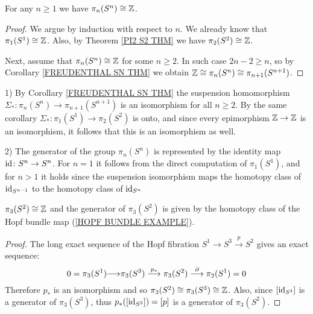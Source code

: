 \begin{corollary}
\label{PIN SN COROLLARY}
For any $n\geq 1$ we have $\pi_{n}(S^{n})\cong {\mathbb Z}$. 
\end{corollary}

\begin{proof}

We argue by induction with respect to $n$. We already know that $\pi_{1}(S^{1})\cong {\mathbb Z}$. 
Also, by Theorem \ref{PI2 S2 THM} we have $\pi_{2}(S^{2}) \cong {\mathbb Z}$. 

Next, assume that $\pi_{n}(S^{n})\cong {\mathbb Z}$ for some $n\geq 2$. 
In such case $2n - 2 \geq n$, so by Corollary \ref{FREUDENTHAL SN THM} we obtain 
${\mathbb Z} \cong \pi_{n}(S^{n})\cong \pi_{n+1}(S^{n+1})$. 
\end{proof}

\begin{note}
\label{PIN SN NOTE}
1) By Corollary \ref{FREUDENTHAL SN THM} the suspension homomorphism 
$\Sigma_{\ast}\colon \pi_{n}(S^{n}) \to \pi_{n+1}(S^{n+1})$
is an isomorphism for all $n\geq 2$. By the same corollary 
$\Sigma_{\ast}\colon \pi_{1}(S^{1}) \to \pi_{2}(S^{2})$ is onto,  
and since every epimorphism ${\mathbb Z} \to {\mathbb Z}$ is an isomorphism, it follows 
that this is an isomorphism as well. 

2) The generator of the group $\pi_{n}(S^{n})$ is represented by 
the identity map $\mathrm{id}\colon S^{n}\to S^{n}$. For $n=1$ it follows 
from the direct computation of $\pi_{1}(S^{1})$, and for $n> 1$
it holds since the suspension isomorphism maps the homotopy class 
of $\mathrm{id}_{S^{n-1}}$ to the homotopy class of $\mathrm{id}_{S^{n}}$
\end{note}


\begin{corollary}
$\pi_{3}(S^{2}) \cong {\mathbb Z}$ and the generator of $\pi_{3}(S^{2})$ is given by the 
homotopy class of the Hopf bundle map (\ref{HOPF BUNDLE EXAMPLE}). 
\end{corollary}

\begin{proof}
The long exact sequence of the Hopf fibration $S^{1}\to S^{3} \overset{p}{\to} S^{2}$ gives
an exact sequence:
\[
0 = \pi_{3}(S^{1}) {\longrightarrow}
\pi_{3}(S^{3}) \overset{p_{\ast}}{\longrightarrow}
\pi_{3}(S^{2}) \overset{\partial}{\longrightarrow} 
\pi_{2}(S^{1}) = 0
\]
Therefore $p_{\ast}$ is an isomorphism and so 
$\pi_{3}(S^{2}) \cong \pi_{3}(S^{3})\cong {\mathbb Z}$. Also, since 
$[\mathrm{id}_{S^{3}}]$ is a generator of $\pi_{3}(S^{3})$, thus 
$p_{\ast}([\mathrm{id}_{S^{3}}]) = [p]$ is a generator of $\pi_{3}(S^{2})$.
\end{proof}

